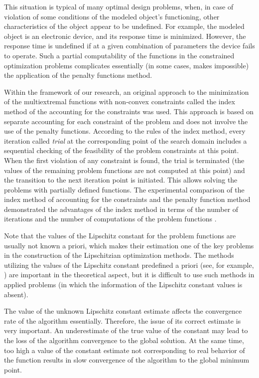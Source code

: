 \documentclass[preprint]{elsarticle}
\begin{document}
	This situation is typical of many optimal design problems, when, in case of violation of some conditions of the modeled object's functioning, other characteristics of the object appear to be undefined. For example, the modeled object is an electronic device, and its response time is minimized. However, the response time is undefined if at a given combination of parameters the device fails to operate. Such a partial computability of the functions in the constrained optimization problems complicates essentially (in some cases, makes impossible) the application of the penalty functions method. 
	
	Within the framework of our research, an original approach to the minimization of the multiextremal functions with non-convex constraints called the index method of the accounting for the constraints 
	\cite{Strongin2000,Pugliese,Barkalov2002,Strongin2003} 
was used. This approach is based on separate accounting for each constraint of the problem and does not involve the use of the penalty functions. According to the rules of the index method, every iteration called \textit{trial} at the corresponding point of the search domain includes a sequential checking of the feasibility of the problem constraints at this point. When the first violation of any constraint is found, the trial is terminated (the values of the remaining problem functions are not computed at this point) and the transition to the next iteration point is initiated. This allows solving the problems with partially defined functions. The experimental comparison of the index method of accounting for the constraints and the penalty function method demonstrated the advantages of the index method in terms of the number of iterations and the number of computations of the problem functions \cite{Barkalov2017_1, Barkalov2017_2}.
	
	Note that the values of the Lipschitz constant for the problem functions are usually not known a priori, which  makes their estimation one of the key problems in the construction of the Lipschitzian optimization methods. The methods utilizing the values of the Lipschitz constant predefined a priori (see, for example, \cite{Piyavskii1972, Shubert1972, Wood1991, Meewella1988, Mladineo1986}) are important in the theoretical aspect, but it is difficult to use such methods in applied problems (in which the information of the Lipschitz constant values is absent).
		
		The value of the unknown Lipschitz constant estimate affects the convergence rate of the algorithm essentially. Therefore, the issue of its correct estimate is very important. An underestimate of the true value of the constant may lead to the loss of the algorithm convergence to the global solution. At the same time, too high a value of the constant estimate not corresponding to real behavior of the function results in slow convergence of the algorithm to the global minimum point. 
		
\end{document}
